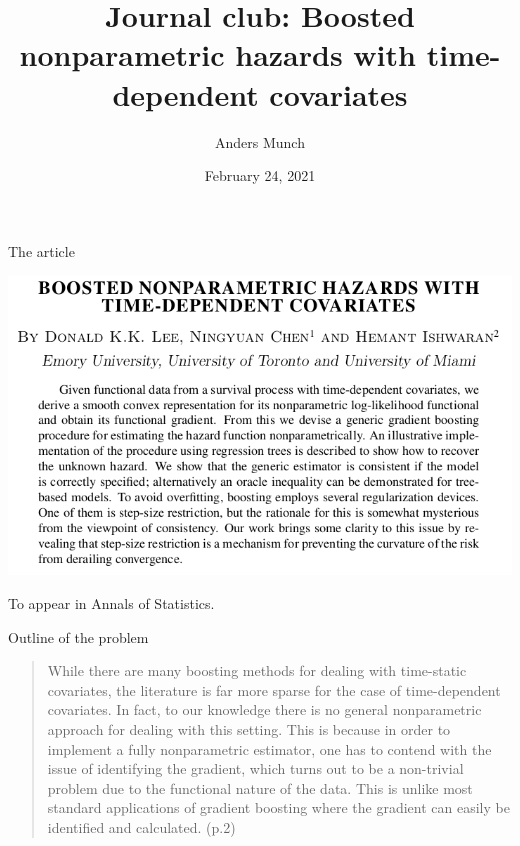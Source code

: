\documentclass{beamer}\usepackage{listings}
\author{Anders Munch}
\date{February 24, 2021}
\title{Journal club: Boosted nonparametric hazards with time-dependent covariates}
\begin{document}
\maketitle
\begin{frame}[label={sec:orgd4cd4a9}]{The article}
\begin{center}
\includegraphics[width=.9\linewidth]{./screenshots/Screenshot_abstract.png}
\end{center}

To appear in Annals of Statistics. 
\end{frame}

\begin{frame}[label={sec:org3b136f7}]{Outline of the problem}
\begin{quote} %
While there are many \alert{boosting methods} for dealing with time-static covariates, the literature is
far more sparse for the case of time-dependent covariates. In fact, to our knowledge there is \alert{no
general nonparametric approach for dealing with this setting}. This is because in order to implement
a fully nonparametric estimator, one has \alert{to contend with the issue of identifying the gradient,
which turns out to be a non-trivial problem due to the functional nature of the data}. This is
unlike most standard applications of gradient boosting where the gradient can easily be identified
and calculated. (p.2)
\end{quote}
\end{frame}
\end{document}
